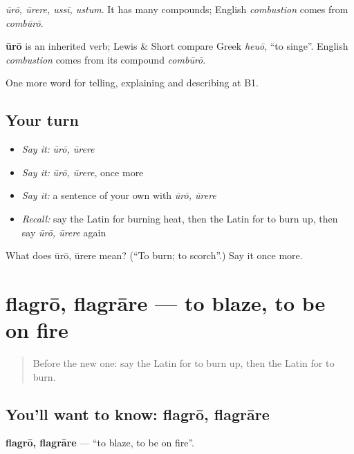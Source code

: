 \emph{ūrō, ūrere, ussī, ustum}. It has many compounds; English \emph{combustion} comes from \emph{combūrō}.

\begin{cousinweb}
\textbf{ūrō} is an inherited verb; Lewis \& Short compare Greek \emph{heuō}, \textquotedblleft{}to singe\textquotedblright{}. English \emph{combustion} comes from its compound \emph{combūrō}.
\end{cousinweb}

\begin{grammarlens}[title={What you've built}]
One more word for telling, explaining and describing at B1.
\end{grammarlens}

\subsection*{Your turn}
\begin{itemize}
\raggedright
  \item \emph{Say it:} \emph{ūrō, ūrere}
  \item \emph{Say it:} \emph{ūrō, ūrere}, once more
  \item \emph{Say it:} a sentence of your own with \emph{ūrō, ūrere}
  \item \emph{Recall:} say the Latin for burning heat, then the Latin for to burn up, then say \emph{ūrō, ūrere} again
\end{itemize}

\begin{tcolorbox}[breakable,colback=teal!4,colframe=teal!35!black,title={Before you move on}]
What does ūrō, ūrere mean? (\textquotedblleft{}To burn; to scorch\textquotedblright{}.) Say it once more.
\end{tcolorbox}
\section[flagrō, flagrāre]{flagrō, flagrāre — to blaze, to be on fire}

\label{lesson:LA-C318-flagro}



\begin{quote}
Before the new one: say the Latin for to burn up, then the Latin for to burn.
\end{quote}

\subsection*{You'll want to know: flagrō, flagrāre}
\textbf{flagrō, flagrāre} — \textquotedblleft{}to blaze, to be on fire\textquotedblright{}.

